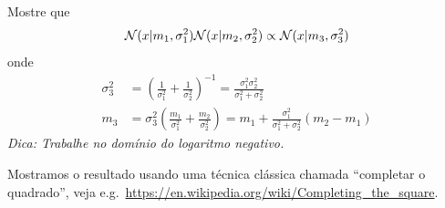 \begin{exenumerate}
    \item Mostre que
    \begin{equation}
        \mathcal{N}(x | m_1, \sigma_1^2) \mathcal{N}(x | m_2, \sigma_2^2) \propto \mathcal{N}(x | m_3, \sigma_3^2) \label{eq:Gaussian-mult-alt}
    \end{equation}
    onde
    \begin{align}
        \sigma^2_3 & = \left( \frac{1}{\sigma_1^2} + \frac{1}{\sigma_2^2}\right)^{-1} = \frac{\sigma_1^2 \sigma_2^2}{\sigma_1^2+\sigma_2^2}\\
        m_3 & = \sigma_3^2\left( \frac{m_1}{\sigma_1^2}+ \frac{m_2}{\sigma_2^2}\right) = m_1 + \frac{\sigma_1^2}{\sigma_1^2+\sigma_2^2}(m_2-m_1)
    \end{align}
    \emph{Dica: Trabalhe no dom\'inio do logaritmo negativo.}
    
    \begin{solution}
        Mostramos o resultado usando uma t\'ecnica cl\'assica chamada ``completar o quadrado'', veja e.g.\ \url{https://en.wikipedia.org/wiki/Completing_the_square}.
        

\end{solution}
\end{exenumerate}
